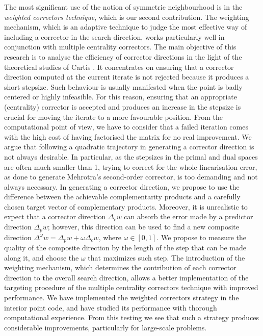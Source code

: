 The most significant use of the notion of symmetric neighbourhood
is in the {\em weighted correctors technique},
which is our second contribution.
The weighting mechanism, which is an adaptive technique to judge the
most effective way of including a corrector in the search direction, 
works particularly well in conjunction with multiple centrality
correctors.
The main objective of this research is to analyse the efficiency of
corrector directions in the light of the theoretical studies of Cartis
\cite{Cartis04,Cartis05}. It concentrates on ensuring that a corrector
direction computed at the current iterate is not rejected because it
produces a short stepsize. Such behaviour is usually manifested when
the point is badly centered or highly infeasible.
For this reason, ensuring that an appropriate (centrality) corrector
is accepted and produces an increase in the stepsize is crucial
for moving the iterate to a more favourable position.
From the computational point of view, we have to consider that
a failed iteration comes with the high cost of having factorised
the matrix for no real improvement.
We argue that following a quadratic trajectory in generating a
corrector direction is not always desirable. In particular, as the stepsizes 
in the primal and dual spaces are often much smaller than 1,
trying to correct for the whole linearisation error,
as done to generate Mehrotra's second-order corrector, is too
demanding and not always necessary.
In generating a corrector direction, we propose to use 
the difference between the achievable complementarity products 
and a carefully chosen target vector of complementary products.
Moreover, it is unrealistic to expect that a corrector direction $\Delta_c w$
can absorb the error made by a predictor direction $\Delta_p w$;
however, this direction can be used to find a new composite
direction $\Delta^\omega w = \Delta_p w + \omega\Delta_c w$, where
$\omega \in [0,1]$.
We propose to measure the quality of the composite direction
by the length of the step that can be made along it, and choose
the $\omega$ that maximizes such step.
The introduction of the weighting mechanism, which determines
the contribution of each corrector direction to the overall
search direction, allows a better implementation
of the targeting procedure of the multiple centrality correctors technique
with improved performance.
We have implemented the weighted correctors strategy in the \HOPDM
interior point code, and have studied its performance with thorough
computational experience. 
From this testing we see that such a strategy 
produces considerable improvements, particularly for large-scale
problems.

